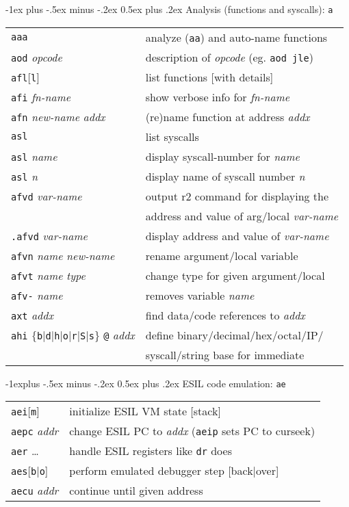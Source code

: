 \documentclass[a4paper,landscape]{article}
\makeatletter
\renewcommand{\section}{\@startsection{section}{1}{0mm}%
                                {-1ex plus -.5ex minus -.2ex}%
                                {0.5ex plus .2ex}%
                                {\normalfont\large\bfseries}}
\renewcommand{\subsection}{\@startsection{subsection}{2}{0mm}%
                                {-1explus -.5ex minus -.2ex}%
                                {0.5ex plus .2ex}%
                                {\normalfont\normalsize\bfseries}}
\makeatother
\begin{document}
\begin{multicols*}{3}
\section{Analysis (functions and syscalls): \texttt{a}}
\begin{tabular}{@{}ll@{}}
\texttt{aaa} & analyze (\texttt{aa}) and auto-name functions \\
\texttt{aod} \textit{opcode} & description of \textit{opcode} (eg. \texttt{aod jle}) \\
\texttt{afl}[\texttt{l}] & list functions [with details] \\
\texttt{afi} \textit{fn-name} & show verbose info for \textit{fn-name} \\
\texttt{afn} \textit{new-name} \textit{addx} & (re)name function at address \textit{addx} \\
\texttt{asl} & list syscalls \\
\texttt{asl} \textit{name} & display syscall-number for \textit{name} \\
\texttt{asl} \textit{n} & display name of syscall number \textit{n} \\
\texttt{afvd} \textit{var-name} & output r2 command for displaying the \\ & address and value of arg/local \textit{var-name} \\
\texttt{.afvd} \textit{var-name} & display address and value of \textit{var-name} \\
\texttt{afvn} \textit{name} \textit{new-name} & rename argument/local variable \\
\texttt{afvt} \textit{name} \textit{type} & change type for given argument/local \\
\texttt{afv-} \textit{name} & removes variable \textit{name} \\
\texttt{axt} \textit{addx} & find data/code references to \textit{addx} \\
\texttt{ahi} $\{$\texttt{b}$|$\texttt{d}$|$\texttt{h}$|$\texttt{o}$|$\texttt{r}$|$\texttt{S}$|$\texttt{s}$\}$ \texttt{@} \textit{addx} & define binary/decimal/hex/octal/IP/ \\ & syscall/string base for immediate \\
\end{tabular}
\vspace{-4mm}
\subsection{ESIL code emulation: \texttt{ae}}
\begin{tabular}{@{}ll@{}}
\texttt{aei}[\texttt{m}] & initialize ESIL VM state [stack] \\
\texttt{aepc} \textit{addr} & change ESIL PC to \textit{addx} (\texttt{aeip} sets PC to curseek)\\
\texttt{aer} \dots & handle ESIL registers like \texttt{dr} does \\
\texttt{aes}[\texttt{b}|\texttt{o}] & perform emulated debugger step [back|over] \\
\texttt{aecu} \textit{addr} & continue until given address \\
\end{tabular}
\vspace{-1mm}

\end{multicols*}
\end{document}
